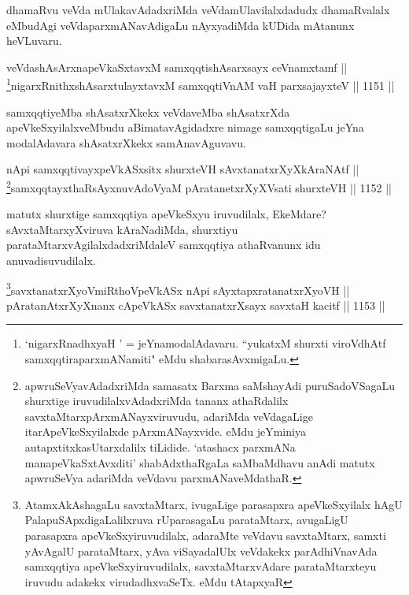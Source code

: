 \begin{artha}
dhamaRvu veVda mUlakavAdadxriMda veVdamUlavilalxdadudx dhamaRvalalx eMbudAgi veVdaparxmANavAdigaLu nAyxyadiMda kUDida mAtanunx heVLuvaru.
\end{artha}


\begin{shl}
veVdashAsArxnapeVkaSxtavxM samxqqtishAsarxsayx ceVnamxtamf ||  \\
\footnote{`nigarxRnadhxyaH ' = jeYnamodalAdavaru. ``yukatxM shurxti viroVdhAtf samxqqtiraparxmANamiti" eMdu shabarasAvxmigaLu.}nigarxRnithxshAsarxtulayxtavxM samxqqtiVnAM vaH parxsajayxteV \hfill || 1151 ||  
\end{shl}


\begin{artha}
samxqqtiyeMba shAsatxrXkekx veVdaveMba shAsatxrXda apeVkeSxyilalxveMbudu aBimatavAgidadxre nimage samxqqtigaLu jeYna modalAdavara shAsatxrXkekx samAnavAguvavu.
\end{artha}


\begin{shl}
nApi samxqqtivayxpeVkASx\s sitx shurxteVH sAvxtanatxrXyXkAraNAtf || \\
\footnote{apwruSeVyavAdadxriMda samasatx Barxma saMshayAdi puruSadoVSagaLu shurxtige iruvudilalxvAdadxriMda tananx athaRdalilx savxtaMtarxpArxmANayxviruvudu, adariMda veVdagaLige itarApeVkeSxyilalxde pArxmANayxvide. eMdu jeYminiya autapxtitxkasUtarxdalilx tiLidide. `atashacx parxmANa manapeVkaSxtAvxditi' shabAdxthaRgaLa saMbaMdhavu anAdi matutx apwruSeVya adariMda veVdavu parxmANaveMdathaR.}samxqqtayxthaRsAyxnuvAdoV\s yaM pAratanetxrXyXV\s sati shurxteVH \hfill || 1152 ||  
\end{shl}


\begin{artha}
matutx shurxtige samxqqtiya apeVkeSxyu iruvudilalx, EkeMdare? sAvxtaMtarxyXviruva kAraNadiMda, shurxtiyu parataMtarxvAgilalxdadxriMdaleV samxqqtiya athaRvanunx idu anuvadisuvudilalx.
\end{artha}

\begin{shl}
\footnote{AtamxAkAshagaLu savxtaMtarx, ivugaLige parasapxra apeVkeSxyilalx hAgU PalapuSApxdigaLalilxruva rUparasagaLu parataMtarx, avugaLigU parasapxra apeVkeSxyiruvudilalx, adaraMte veVdavu savxtaMtarx, samxti yAvAgalU parataMtarx, yAva viSayadalUlx veVdakekx parAdhiVnavAda samxqqtiya apeVkeSxyiruvudilalx, savxtaMtarxvAdare parataMtarxteyu iruvudu adakekx virudadhxvaSeTx. eMdu tAtapxyaR}savxtanatxrXyoVmiRthoV\s peVkASx nApi sAyxtapxratanatxrXyoVH || \\
pAratanAtxrXyXnanx cApeVkASx savxtanatxrXsayx savxtaH kacitf \hfill || 1153 ||  
\end{shl}

